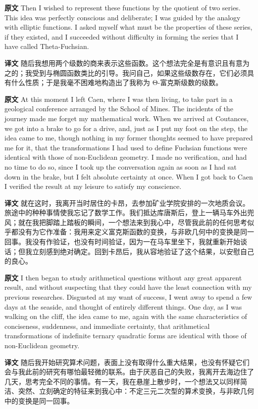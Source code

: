 \documentclass[UTF8,zihao=-4]{ctexart}
\newcommand{\BodyFont}{\fontsize{10.5pt}{15.5pt}\selectfont}
\newcommand{\origlabel}{\textbf{原文}\quad}
\newcommand{\translabel}{\textbf{译文}\quad}
\newenvironment{enblock}{\par\noindent\begingroup\BodyFont\origlabel}{\par\endgroup}
\newenvironment{zhblock}{\par\noindent\begingroup\BodyFont\translabel}{\par\endgroup\vspace{0.35em}}
\begin{document}
\begin{enblock}
Then I wished to represent these functions by the quotient of two series. This idea was perfectly conscious and deliberate; I was guided by the analogy with elliptic functions. I asked myself what must be the properties of these series, if they existed, and I succeeded without difficulty in forming the series that I have called Theta-Fuchsian.
\end{enblock}
\begin{zhblock}
随后我想用两个级数的商来表示这些函数。这个想法完全是有意识且有意为之的；我受到与椭圆函数类比的引导。我问自己，如果这些级数存在，它们必须具有什么性质；于是我毫不困难地构造出了我称为 Θ-富克斯级数的级数。\end{zhblock}

\begin{enblock}
At this moment I left Caen, where I was then living, to take part in a geological conference arranged by the School of Mines. The incidents of the journey made me forget my mathematical work. When we arrived at Coutances, we got into a brake to go for a drive, and, just as I put my foot on the step, the idea came to me, though nothing in my former thoughts seemed to have prepared me for it, that the transformations I had used to define Fuchsian functions were identical with those of non-Euclidean geometry. I made no verification, and had no time to do so, since I took up the conversation again as soon as I had sat down in the brake, but I felt absolute certainty at once. When I got back to Caen I verified the result at my leisure to satisfy my conscience.
\end{enblock}
\begin{zhblock}
就在这时，我离开当时居住的卡昂，去参加矿业学院安排的一次地质会议。旅途中的种种事情使我忘记了数学工作。我们抵达库唐斯后，登上一辆马车外出兜风；就在我把脚踏上踏板的瞬间，一个想法来到我心中，尽管我此前的任何思考似乎都没有为它作准备：我用来定义富克斯函数的变换，与非欧几何中的变换是同一回事。我没有作验证，也没有时间验证，因为一在马车里坐下，我就重新开始谈话；但我立刻感到绝对确定。回到卡昂后，我从容地验证了这个结果，以安慰自己的良心。\end{zhblock}

\begin{enblock}
I then began to study arithmetical questions without any great apparent result, and without suspecting that they could have the least connection with my previous researches. Disgusted at my want of success, I went away to spend a few days at the seaside, and thought of entirely different things. One day, as I was walking on the cliff, the idea came to me, again with the same characteristics of conciseness, suddenness, and immediate certainty, that arithmetical transformations of indefinite ternary quadratic forms are identical with those of non-Euclidean geometry.
\end{enblock}
\begin{zhblock}
随后我开始研究算术问题，表面上没有取得什么重大结果，也没有怀疑它们会与我此前的研究有哪怕最轻微的联系。由于厌恶自己的失败，我离开去海边住了几天，思考完全不同的事情。有一天，我在悬崖上散步时，一个想法又以同样简洁、突然、立刻确定的特征来到我心中：不定三元二次型的算术变换，与非欧几何中的变换是同一回事。\end{zhblock}
\end{document}
